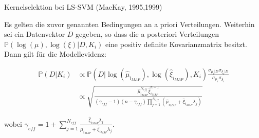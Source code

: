\documentclass{beamer}
\begin{document}
{%




\begin{frame}

\begin{block}{Kernelselektion bei LS-SVM (MacKay, 1995,1999)}

Es gelten die zuvor genannten Bedingungen an a priori Verteilungen. Weiterhin sei ein Datenvektor $D$ gegeben, so dass die a posteriori Verteilungen $\mathbb{P}(\log(\mu),\log(\xi) \vert D, K_i)$ eine positiv definite Kovarianzmatrix besitzt. Dann gilt für die Modellevidenz:


\begin{align}
\mathbb{P}(D \vert K_i) & \propto \mathbb{P}(D \vert \log(\hat{\mu}_{i_{MAP}}), \log(\hat{\xi}_{i_{MAP}}), K_i)\frac{\sigma_{\mu_i\vert D} \sigma_{\xi_i\vert D}}{\sigma_{\mu_i} \sigma_{\xi_i}}\\
&\propto \sqrt{\frac{\hat{\mu}^{N_{eff}}_{i_{MAP}} \hat{\xi}^{n-1}_{i_{MAP}}}{(\gamma_{eff}-1)(n - \gamma_{eff}) \prod_{j=1}^{N_{eff}}(\hat{\mu}_{i_{MAP}} + \hat{\xi}_{i_{MAP}}\lambda_j)}}
\end{align}

wobei $\gamma_{eff} = 1 + \sum_{j=1}^{N_{eff}}\frac{\hat{\xi}_{i_{MAP}}\lambda_j}{\hat{\mu}_{i_{MAP}} + \hat{\xi}_{i_{MAP}}\lambda_j}$.

\end{block}

\end{frame}






}
\end{document}
